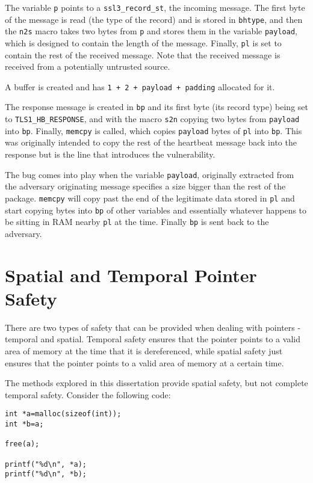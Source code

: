 The variable \verb!p! points to a \verb!ssl3_record_st!, the incoming message.
The first byte of the message is read (the type of the record) and is stored in \verb!bhtype!, and then the \verb!n2s! macro takes two bytes from \verb!p! and stores them in the variable \verb!payload!, which is designed to contain the length of the message.
Finally, \verb!pl! is set to contain the rest of the received message.
Note that the received message is received from a potentially untrusted source.

A buffer is created and has \verb!1 + 2 + payload + padding! allocated for it.

The response message is created in \verb!bp! and its first byte (its record type) being set to \verb!TLS1_HB_RESPONSE!, and with the macro \verb!s2n! copying two bytes from \verb!payload! into \verb!bp!.
Finally, \verb!memcpy! is called, which copies \verb!payload! bytes of \verb!pl! into \verb!bp!.
This was originally intended to copy the rest of the heartbeat message back into the response but is the line that introduces the vulnerability.

The bug comes into play when the variable \verb!payload!, originally extracted from the adversary originating message specifies a size bigger than the rest of the package.
\verb!memcpy! will copy past the end of the legitimate data stored in \verb!pl! and start copying bytes into \verb!bp! of other variables and essentially whatever happens to be sitting in RAM nearby \verb!pl! at the time.
Finally \verb!bp! is sent back to the adversary.


\section{Spatial and Temporal Pointer Safety}

There are two types of safety that can be provided when dealing with pointers - temporal and spatial.
Temporal safety ensures that the pointer points to a valid area of memory at the time that it is dereferenced, while spatial safety just ensures that the pointer points to a valid area of memory at a certain time.

The methods explored in this dissertation provide spatial safety, but not complete temporal safety.
Consider the following code:

\begin{verbatim}
int *a=malloc(sizeof(int));
int *b=a;

free(a);

printf("%d\n", *a);
printf("%d\n", *b);
\end{verbatim}

